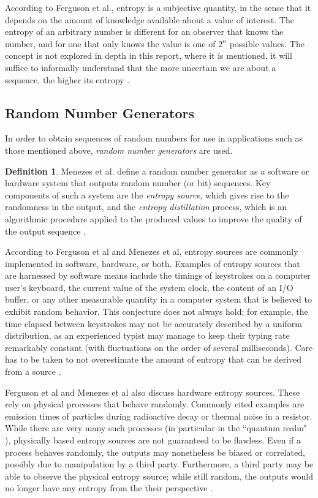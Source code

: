 \documentclass[12pt, titlepage]{report}
\theoremstyle{definition}
\newtheorem{definition}{Definition}
\begin{document}
According to Ferguson et al., entropy is a subjective quantity, in the sense that it depends on the amount of knowledge available about a value of interest. The entropy of an arbitrary number is different for an observer that knows the number, and for one that only knows the value is one of $2^{n}$ possible values. The concept is not explored in depth in this report, where it is mentioned, it will suffice to informally understand that the more uncertain we are about a sequence, the higher its entropy \cite[p. 137]{ferguson2010cryptography}.



\subsection{Random Number Generators}
In order to obtain sequences of random numbers for use in applications such as those mentioned above, \emph{random number generators} are used.

\begin{definition}
Menezes et al. define a random number generator as a software or hardware system that outputs random number (or bit) sequences. Key components of such a system are the \emph{entropy source}, which gives rise to the randomness in the output, and the \emph{entropy distillation} process, which is an algorithmic procedure applied to the produced values to improve the quality of the output sequence \cite{menezes1996handbook}.
\end{definition}

According to Ferguson et al and Menezes et al, entropy sources are commonly implemented in software, hardware, or both. Examples of entropy sources that are harnessed by software means include the timings of keystrokes on a computer user's keyboard, the current value of the system clock, the content of an I/O buffer, or any other measurable quantity in a computer system that is believed to exhibit random behavior. This conjecture does not always hold; for example, the time elapsed between keystrokes may not be accurately described by a uniform distribution, as an experienced typist may manage to keep their typing rate remarkably constant (with fluctuations on the order of several milliseconds). Care has to be taken to not overestimate the amount of entropy that can be derived from a source \cite[p. 138-139]{ferguson2010cryptography} \cite[p. 171-172]{menezes1996handbook}.

Ferguson et al and Menezes et al also discuss hardware entropy sources. These rely on physical processes that behave randomly. Commonly cited examples are emission times of particles during radioactive decay or thermal noise in a resistor. While there are very many such processes (in particular in the ``quantum realm" \cite{bierhorst2018experimentally}), physically based entropy sources are not guaranteed to be flawless. Even if a process behaves randomly, the outputs may nonetheless be biased or correlated, possibly due to manipulation by a third party. Furthermore, a third party may be able to observe the physical entropy source; while still random, the outputs would no longer have any entropy from the their perspective \cite[p. 138-139]{ferguson2010cryptography} \cite[p. 172]{menezes1996handbook}.
\end{document}

